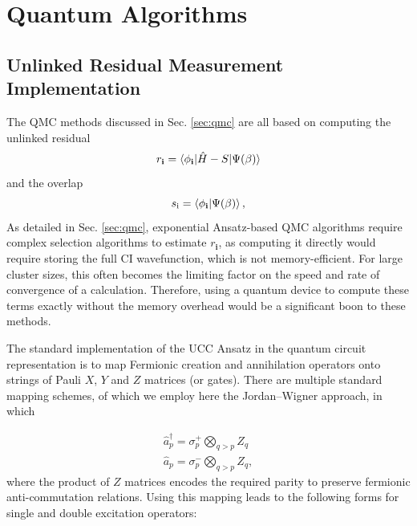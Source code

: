 \documentclass[%
 reprint,
 amsmath,amssymb,
 aps,
]{revtex4-2}
\begin{document}
\section{Quantum Algorithms}
\subsection{Unlinked Residual Measurement Implementation}\label{sec:algorithm}
The QMC methods discussed in Sec. \ref{sec:qmc} are all based on computing the unlinked residual 
\begin{equation}
    r_\mathbf{i} = \braket{\phi_\mathbf{i}|\hat H-S|\Psi(\beta)}
\end{equation}
and the overlap
\begin{equation}
    s_\mathrm{i} = \braket{\phi_\mathbf{i}|\Psi(\beta)},
\end{equation}
As detailed in Sec. \ref{sec:qmc}, exponential Ansatz-based QMC algorithms require complex selection algorithms to estimate $r_\mathbf{i}$, as computing it directly would require storing the full CI wavefunction, which is not memory-efficient. For large cluster sizes, this often becomes the limiting factor on the speed and rate of convergence of a calculation. Therefore, using a quantum device to compute these terms exactly without the memory overhead would be a significant boon to these methods. 

The standard implementation of the UCC Ansatz in the quantum circuit representation is to map Fermionic creation and annihilation operators onto strings of Pauli $X$, $Y$ and $Z$ matrices (or gates). There are multiple standard mapping schemes,\cite{Jordan1928,Bravyi2002,Seeley2012,Tranter2015} of which we employ here the Jordan--Wigner approach,\cite{Jordan1928} in which

\begin{equation}
\begin{split}
\hat a_p^\dagger = \sigma_p^+ \bigotimes_{q>p} Z_q \\
\hat a_p = \sigma_p^- \bigotimes_{q>p} Z_q,
\end{split}
\end{equation}
where the product of $Z$ matrices encodes the required parity to preserve fermionic anti-commutation relations. Using this mapping leads to the following forms for single and double excitation operators:
\end{document}
